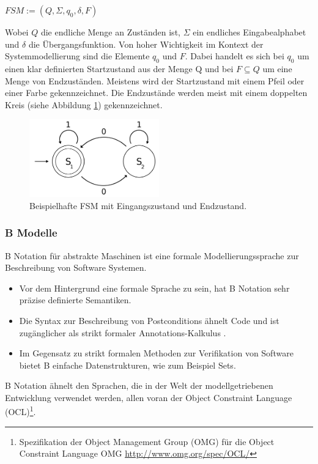 \begin{center}
$FSM := (Q, \Sigma, q_0, \delta, F)$
\end{center}

Wobei $Q$ die endliche Menge an Zuständen ist, $\Sigma$ ein endliches Eingabealphabet und $\delta$ die Übergangsfunktion. Von hoher Wichtigkeit im Kontext der Systemmodellierung sind die Elemente $q_0$ und $F$. Dabei handelt es sich bei $q_0$ um einen klar definierten Startzustand aus der Menge Q und bei $F \subseteq Q$ um eine Menge von Endzuständen. Meistens wird der Startzustand mit einem Pfeil oder einer Farbe gekennzeichnet. Die Endzustände werden meist mit einem doppelten Kreis (siehe Abbildung \ref{fig:fsm_example}) gekennzeichnet.

\begin{figure}[h] 
  \centering
     \includegraphics[width=0.5\textwidth]{figures/FSM_example.png}
  \caption{Beispielhafte FSM mit Eingangszustand und Endzustand.}
  \label{fig:fsm_example}
\end{figure}

\subsubsection{B Modelle}
B Notation für abstrakte Maschinen ist eine formale Modellierungssprache zur Beschreibung von Software Systemen.
\begin{itemize}
\item Vor dem Hintergrund eine formale Sprache zu sein, hat B Notation sehr präzise definierte Semantiken.
\item Die Syntax zur Beschreibung von Postconditions ähnelt Code und ist zugänglicher als strikt formaler Annotations-Kalkulus \cite{huth_logic_2004}.
\item Im Gegensatz zu strikt formalen Methoden zur Verifikation von Software bietet B einfache Datenstrukturen, wie zum Beispiel Sets.
\end{itemize}

B Notation ähnelt den Sprachen, die in der Welt der modellgetriebenen Entwicklung verwendet werden, allen voran der Object Constraint Language (OCL)\footnote{Spezifikation der Object Management Group (OMG) für die Object Constraint Language \cite{warmer_object_2004} OMG \url{http://www.omg.org/spec/OCL/}}.

